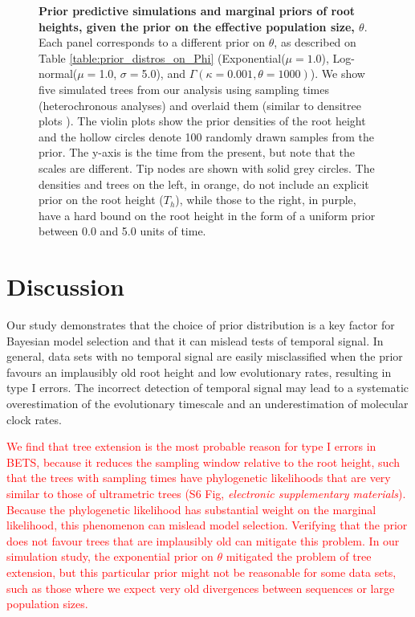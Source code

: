 \documentclass[10pt,letterpaper]{article}
\begin{document}
\begin{figure}[!h]
\begin{center}
		\caption{\textbf{Prior predictive simulations and marginal priors of root heights, given the prior on the effective population size, $\theta$}. Each panel corresponds to a different prior on $\theta$, as described on Table \ref{table:prior_distros_on_Phi} (Exponential($\mu=1.0$), Log-normal($\mu=$1.0, $\sigma=$5.0), and $\Gamma(\kappa=0.001, \theta=1000)$). We show five simulated trees from our analysis using sampling times (heterochronous analyses) and overlaid them (similar to densitree plots \cite{bouckaert2010densitree}). The violin plots show the prior densities of the root height and the hollow circles denote 100 randomly drawn samples from the prior. The y-axis is the time from the present, but note that the scales are different. Tip nodes are shown with solid grey circles. The densities and trees on the left, in orange, do not include an explicit prior on the root height ($T_h$), while those to the right, in purple, have a hard bound on the root height in the form of a uniform prior between 0.0 and 5.0 units of time.}
		\label{figure:prior_tree_distros}
	\end{center}
\end{figure}

\section*{Discussion}
Our study demonstrates that the choice of prior distribution is a key factor for Bayesian model selection and that it can mislead tests of temporal signal. In general, data sets with no temporal signal are easily misclassified when the prior favours an implausibly old root height and low evolutionary rates, resulting in type I errors. The incorrect detection of temporal signal may lead to a systematic overestimation of the evolutionary timescale and an underestimation of molecular clock rates.

\textcolor{red}{We find that tree extension is the most probable reason for type I errors in BETS, because it reduces the sampling window relative to the root height, such that the trees with sampling times have phylogenetic likelihoods that are very similar to those of ultrametric trees (S6 Fig, \textit{electronic supplementary materials}). Because the phylogenetic likelihood has substantial weight on the marginal likelihood, this phenomenon can mislead model selection. Verifying that the prior does not favour trees that are implausibly old can mitigate this problem. In our simulation study, the exponential prior on $\theta$ mitigated the problem of tree extension, but this particular prior might not be reasonable for some data sets, such as those where we expect very old divergences between sequences or large population sizes.}
\end{document}
